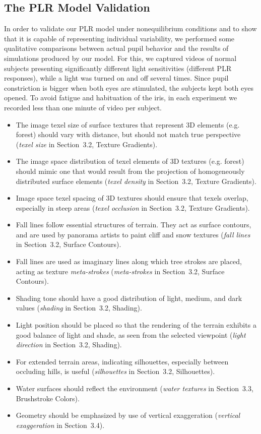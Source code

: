 \documentclass{acmtog} %
\begin{document}
\subsection{The PLR Model Validation}
\label{sec:PLRValidation}
%
In order to validate our PLR model under nonequilibrium conditions and
to show that it is capable of representing individual variability, we
performed some qualitative comparisons between actual pupil behavior and
the results of simulations produced by our model. For this, we captured
videos of normal subjects presenting significantly different light
sensitivities (different PLR responses), while a light was turned {on}
and {off} several times. Since pupil constriction is bigger when both
eyes are stimulated, the subjects kept both eyes opened. To avoid
fatigue and habituation of the iris, in each experiment we recorded less
than one minute of video per subject.
\begin{itemize}
\item The image texel size of surface textures that represent 3D
elements (e.g. forest) should vary with distance, but should not match
true perspective (\emph{texel size} in Section~3.2, Texture Gradients).
\item The image space distribution of texel elements of 3D textures
(e.g. forest) should mimic one that would result from the projection of
homogeneously distributed surface elements (\emph{texel density} in
Section~3.2, Texture Gradients).
\item Image space texel spacing of 3D textures should ensure that texels
overlap, especially in steep areas (\emph{texel occlusion} in
Section~3.2, Texture Gradients).
\item Fall lines follow essential structures of terrain. They act as
surface contours, and are used by panorama artists to paint cliff and
snow textures (\emph{fall lines} in Section~3.2, Surface Contours).
\item Fall lines are used as imaginary lines along which tree strokes
are placed, acting as texture \emph{meta-strokes} (\emph{meta-strokes}
in Section~3.2, Surface Contours).
\item Shading tone should have a good distribution of light, medium, and
dark values (\emph{shading} in Section~3.2, Shading).
\item Light position should be placed so that the rendering of the
terrain exhibits a good balance of light and shade, as seen from the
selected viewpoint (\emph{light direction} in Section~3.2, Shading).
\item For extended terrain areas, indicating silhouettes, especially
between occluding hills, is useful (\emph{silhouettes} in Section~3.2,
Silhouettes).
\item Water surfaces should reflect the environment (\emph{water
textures} in Section~3.3, Brushstroke Colors).
\item Geometry should be emphasized by use of vertical exaggeration
(\emph{vertical exaggeration} in Section~3.4).
\end{itemize}
\end{document}
